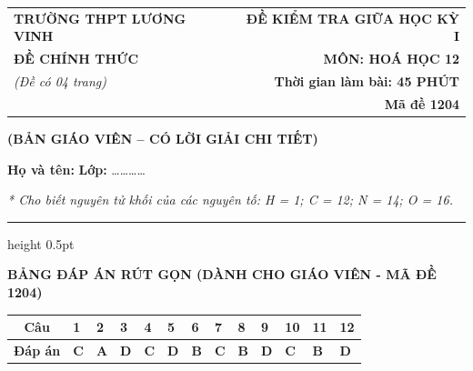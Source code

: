\documentclass[11pt,a4paper]{article}
\begin{document}
\noindent
\begin{tabularx}{\textwidth}{@{}X r@{}}
\textbf{TRƯỜNG THPT LƯƠNG VINH} & \textbf{ĐỀ KIỂM TRA GIỮA HỌC KỲ I} \\
\textbf{ĐỀ CHÍNH THỨC} & \textbf{MÔN: HOÁ HỌC 12} \\
\textit{(Đề có 04 trang)} & \textbf{Thời gian làm bài: 45 PHÚT} \\
& \textbf{Mã đề 1204}
\end{tabularx}

\begin{center}
{\color{hfRed}\textbf{\large (BẢN GIÁO VIÊN -- CÓ LỜI GIẢI CHI TIẾT)}}
\end{center}

\vspace{2pt}
\noindent\textbf{Họ và tên:} \dotfill \textbf{Lớp:} \dots\dots\dots\dots

\vspace{2pt}
\noindent\textit{* Cho biết nguyên tử khối của các nguyên tố: H = 1; C = 12; N = 14; O = 16.}
\vspace{2pt}
\hrule height 0.5pt
\vspace{6pt}

\begin{center}
{\color{hfRed}\textbf{\large BẢNG ĐÁP ÁN RÚT GỌN (DÀNH CHO GIÁO VIÊN - MÃ ĐỀ 1204)}}
\end{center}

\begin{center}
\renewcommand{\arraystretch}{1.2}
\begin{tabular}{|c|*{12}{>{\centering\arraybackslash}m{0.95cm}|}}
\hline
\rowcolor{tableGreen}
\textbf{Câu} & \textbf{1} & \textbf{2} & \textbf{3} & \textbf{4} & \textbf{5} & \textbf{6} & \textbf{7} & \textbf{8} & \textbf{9} & \textbf{10} & \textbf{11} & \textbf{12} \\
\hline
\textbf{Đáp án} & \textbf{\color{hfRed}C} & \textbf{\color{hfRed}A} & \textbf{\color{hfRed}D} & \textbf{\color{hfRed}C} & \textbf{\color{hfRed}D} & \textbf{\color{hfRed}B} & \textbf{\color{hfRed}C} & \textbf{\color{hfRed}B} & \textbf{\color{hfRed}D} & \textbf{\color{hfRed}C} & \textbf{\color{hfRed}B} & \textbf{\color{hfRed}D} \\
\hline
\end{tabular}
\end{center}
\end{document}
